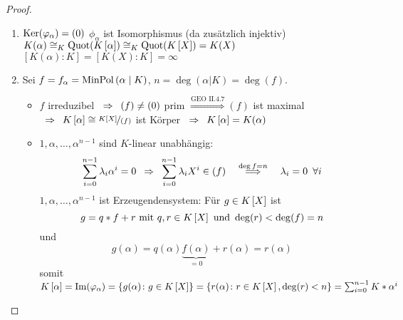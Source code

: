 \begin{proof}
    \begin{enumerate}[leftmargin=*, label=(\alph*)]
        \item $\operatorname{Ker}(\varphi_\alpha) = (0)$ \follows $\phi_\alpha$ ist Isomorphismus (da zusätzlich injektiv) \\
        \follows $K(\alpha) \isomorph_K \Quot(\polynom[K][\alpha]) \isomorph_K \Quot(\polynom[K]) = K(X)$ \\
        \follows $[K(\alpha) \colon K] = [K(X) \colon K] = \infty$
        \item Sei $f = f_\alpha = \operatorname{MinPol}\left( \alpha \mathrel{|} K\right)$, $n = \deg(\alpha | K) = \deg(f)$.
        \begin{itemize}
            \item $f$ irreduzibel $\enskip \Rightarrow \enskip (f) \neq (0)$ prim $\overset{\text{GEO II.4.7}}{\Longrightarrow} (f)$ ist maximal \\
            $\follows \polynom[K][\alpha] \isomorph \lfrac{\polynom[K]}{(f)}$ ist Körper $\follows \polynom[K][\alpha] = K(\alpha)$
            \item $1, \alpha, \dots , \alpha^{n-1}$ sind $K$-linear unabhängig: 
            \begin{equation*}
                \sum_{i=0}^{n-1} \lambda_i \alpha^i = 0 \enskip \Rightarrow \enskip \sum_{i=0}^{n-1} \lambda_i X^i \in (f) \quad \overset{\deg f = n}{\Longrightarrow} \quad \lambda_i = 0 \enskip \forall i
            \end{equation*}
            $1, \alpha, \dots , \alpha^{n-1}$ ist Erzeugendensystem: Für $g \in \polynom[K]$ ist 
            \begin{equation*}
                g = q*f + r \text{ mit } q,r \in \polynom[K] \text{ und } \deg(r) < \deg(f) = n
            \end{equation*}
            und  
            \begin{equation*}
                g(\alpha) = q(\alpha) \underbrace{f(\alpha)}_{=0} + r(\alpha) = r(\alpha)
            \end{equation*}
            somit $\polynom[K][\alpha] = \Image(\phi_\alpha) = \menge{g(\alpha) \colon g \in \polynom[K]} = \menge{r(\alpha) \colon r \in \polynom[K], \deg(r) < n} = \sum_{i=0}^{n-1} K * \alpha^i$
        \end{itemize}
    \end{enumerate}
\end{proof}

